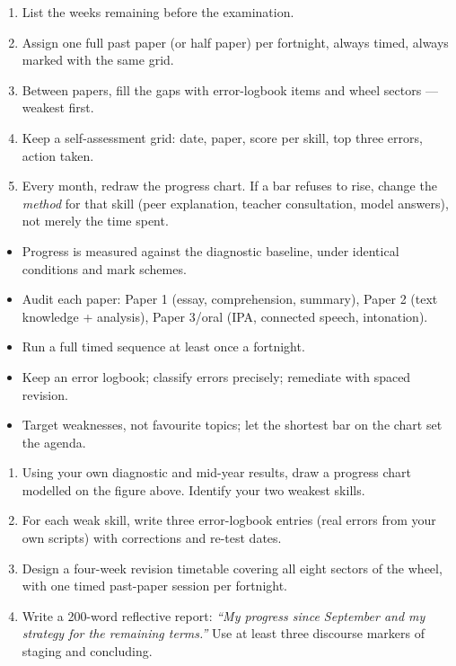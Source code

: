 \documentclass[11pt]{article}
\newcommand{\cle}[1]{{\popxbold\color{popdark}#1}}
\begin{document}
\begin{methode}
\begin{enumerate}
\item List the weeks remaining before the examination.
\item Assign one full past paper (or half paper) per fortnight, always timed, always marked with the same grid.
\item Between papers, fill the gaps with error-logbook items and wheel sectors --- weakest first.
\item Keep a self-assessment grid: date, paper, score per skill, top three errors, action taken.
\item Every month, redraw the progress chart. If a bar refuses to rise, change the \emph{method} for that skill (peer explanation, teacher consultation, model answers), not merely the time spent.
\end{enumerate}
\end{methode}

\begin{aretenir}
\begin{itemize}
\item Progress is measured against the \cle{diagnostic baseline}, under identical conditions and mark schemes.
\item Audit each paper: Paper 1 (essay, comprehension, summary), Paper 2 (text knowledge + analysis), Paper 3/oral (IPA, connected speech, intonation).
\item Run a full timed sequence at least once a fortnight.
\item Keep an error logbook; classify errors precisely; remediate with spaced revision.
\item Target weaknesses, not favourite topics; let the shortest bar on the chart set the agenda.
\end{itemize}
\end{aretenir}

\begin{exercice}
\begin{enumerate}
\item Using your own diagnostic and mid-year results, draw a progress chart modelled on the figure above. Identify your two weakest skills.
\item For each weak skill, write three error-logbook entries (real errors from your own scripts) with corrections and re-test dates.
\item Design a four-week revision timetable covering all eight sectors of the wheel, with one timed past-paper session per fortnight.
\item Write a 200-word reflective report: \emph{``My progress since September and my strategy for the remaining terms.''} Use at least three discourse markers of staging and concluding.
\end{enumerate}
\end{exercice}
\end{document}

